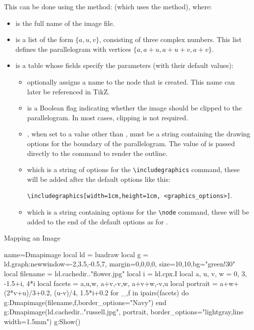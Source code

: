 This can be done using the method:  (which uses the  method), where:
\begin{itemize}
    \item {} is the full name of the image file.
    
    \item {} is a list of the form $\{a,u,v\}$, consisting of three complex numbers. This list defines the parallelogram with vertices $\{a,a+u,a+u+v,a+v\}$.
    
    \item {} is a table whose fields specify the parameters (with their default values):
    \begin{itemize}
        \item {} optionally assigns a name to the node that is created. This name can later be referenced in TikZ.
        
        \item {} is a Boolean flag indicating whether the image should be clipped to the parallelogram. In most cases, clipping is not required.
        
        \item {}, when set to a value other than \nil, must be a string containing the drawing options for the boundary of the parallelogram. The value of  is passed directly to the \drawcmd command to render the outline.
        
        \item {} which is a string of options for the \verb|\includegraphics| command, these will be added after the default options like this:\par
\hfil\verb|\includegraphics[width=1cm,height=1cm, <graphics_options>]|.\hfil

        \item {} which is a string containing options for the \verb|\node| command, these will be added to the end of the default options as for .
    \end{itemize}
\end{itemize}

\begin{demo}{Mapping an Image}
\begin{luadraw}{name=Dmapimage}
local ld = luadraw
local g = ld.graph:new{window={-2,3.5,-0.5,7}, margin={0,0,0,0}, size={10,10},bg="green!30"}
local filename = ld.cachedir.."flower.jpg"
local i = ld.cpx.I
local a, u, v, w = 0, 3, -1.5+i, 4*i
local facets = {{a,u,w}, {a+v,-v,w}, {a+v+w,-v,u} }
local portrait = {a+w+(2*v+u)/3+0.2, (u-v)/4, 1.5*i+0.2}
for _,f in ipairs(facets) do
    g:Dmapimage(filename,f,{border_options="Navy"})
end
g:Dmapimage(ld.cachedir.."russell.jpg", portrait, {border_options="lightgray,line width=1.5mm"})
g:Show()
\end{luadraw}
\end{demo}


